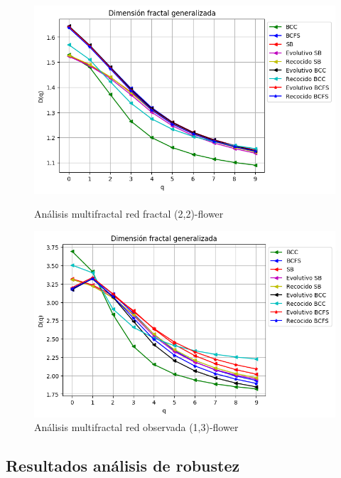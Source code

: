 \begin{figure}[!htb]
    \begin{minipage}{0.48\textwidth}
        \centering
        \includegraphics[scale=0.5]{CapituloAAnexos/imagenesAnexoC/Fractalidad/grafica_Dq20180511_101739floweru2v2.png}
        \caption{Análisis multifractal red fractal (2,2)-flower}
    \end{minipage}\hfill
   \begin{minipage}{0.48\textwidth}
         \centering
        \includegraphics[scale=0.5]{CapituloAAnexos/imagenesAnexoC/Fractalidad/grafica_Dq20180509_000454floweru1v3.png}
    \caption{Análisis multifractal red observada (1,3)-flower}
    \end{minipage}
\end{figure}

\newpage
\subsection*{Resultados análisis de robustez}


